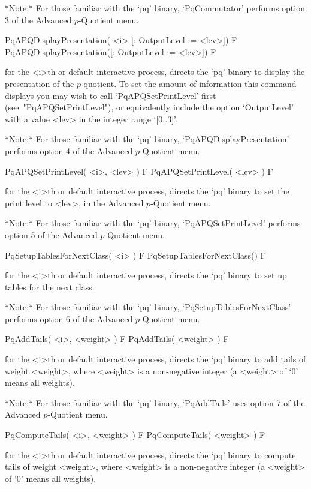 *Note:*
For those familiar with the `pq' binary, `PqCommutator' performs option 3
of the Advanced $p$-Quotient menu.

\>PqAPQDisplayPresentation( <i> [: OutputLevel := <lev>]) F
\>PqAPQDisplayPresentation([: OutputLevel := <lev>]) F

for the <i>th or default interactive {\ANUPQ} process, directs  the  `pq'
binary to display the presentation of the $p$-quotient. To set the amount
of  information  this   command   displays   you   may   wish   to   call
`PqAPQSetPrintLevel' first  (see~"PqAPQSetPrintLevel"),  or  equivalently
include the option `OutputLevel' with a value <lev> in the integer  range
`[0..3]'.


*Note:*
For those  familiar  with  the  `pq'  binary,  `PqAPQDisplayPresentation'
performs option 4 of the Advanced $p$-Quotient menu.

\>PqAPQSetPrintLevel( <i>, <lev> ) F
\>PqAPQSetPrintLevel( <lev> ) F

for the <i>th or default interactive {\ANUPQ} process, directs  the  `pq'
binary to set the print level to  <lev>,  in  the  Advanced  $p$-Quotient
menu.

*Note:* For those familiar with  the  `pq'  binary,  `PqAPQSetPrintLevel'
performs option 5 of the Advanced $p$-Quotient menu.

\>PqSetupTablesForNextClass( <i> ) F
\>PqSetupTablesForNextClass() F

for the <i>th or default interactive {\ANUPQ} process, directs  the  `pq'
binary to set up tables for the next class.

*Note:* 
For those familiar  with  the  `pq'  binary,  `PqSetupTablesForNextClass'
performs option 6 of the Advanced $p$-Quotient menu.

\>PqAddTails( <i>, <weight> ) F
\>PqAddTails( <weight> ) F

for the <i>th or default interactive {\ANUPQ} process, directs  the  `pq'
binary to add tails of weight <weight>, where <weight> is a  non-negative
integer (a <weight> of `0' means all weights).

*Note:*
For those familiar with the `pq' binary, `PqAddTails' uses  option  7  of
the Advanced $p$-Quotient menu.

\>PqComputeTails( <i>, <weight> ) F
\>PqComputeTails( <weight> ) F

for the <i>th or default interactive {\ANUPQ} process, directs  the  `pq'
binary  to  compute  tails  of  weight  <weight>,  where  <weight>  is  a
non-negative integer (a <weight> of `0' means all weights).


